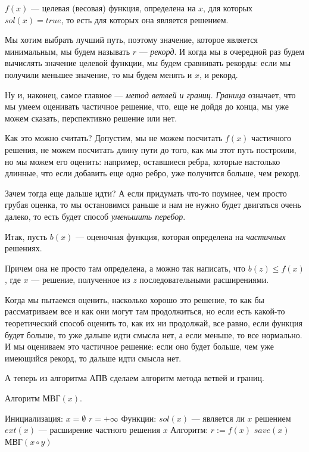 \documentclass[russian]{lecture-notes}
\theoremstyle{definition}
\begin{document}
\begin{example*}
		$f(x)$ --- целевая (весовая) функция, определена на $x$, для которых $sol(x) = true$, то есть для которых она является решением.
		
		Мы хотим выбрать лучший путь, поэтому значение, которое является минимальным, мы будем называть $r$ --- {\em рекорд}.
		И когда мы в очередной раз будем вычислять значение целевой функции, мы будем сравнивать рекорды: если мы получили меньшее значение, то мы будем менять и $x$, и рекорд. 
		
		Ну и, наконец, самое главное --- {\em метод ветвей и границ}.
		{\em Граница} означает, что мы умеем оценивать частичное решение, что, еще не дойдя до конца, мы уже можем сказать, перспективно решение или нет.

		Как это можно считать? Допустим, мы не можем посчитать $f(x)$ частичного решения, не можем посчитать длину пути до того, как мы этот путь построили, но мы можем его оценить: например, оставшиеся ребра, которые настолько длинные, что если добавить еще одно ребро, уже получится больше, чем рекорд.
		
		Зачем тогда еще дальше идти? А если придумать что-то поумнее, чем просто грубая оценка, то мы остановимся раньше и нам не нужно будет двигаться очень далеко, то есть будет способ {\em уменьшить перебор}.
		
		Итак, пусть $b(x)$ --- оценочная функция, которая определена на {\em частичных} решениях.
		
		Причем она не просто там определена, а можно так написать, что $b(z) \leq f(x)$, где $x$ --- решение, полученное из $z$ последовательными расширениями.
		
		Когда мы пытаемся оценить, насколько хорошо это решение, то как бы рассматриваем все и как они могут там продолжиться,
		но если есть какой-то теоретический способ оценить то, как их ни продолжай, все равно, если функция будет больше, то уже дальше идти смысла нет, а если меньше, то все нормально.
		И мы оцениваем это частичное решение: если оно будет больше, чем уже имеющийся рекорд, то дальше идти смысла нет.
		
		А теперь из алгоритма АПВ сделаем алгоритм метода ветвей и границ.
		
		\begin{algorithm}[H]
			\caption{Алгоритм МВГ$(x)$.}
			\label{alg:three}
			\begin{algorithmic}
				\State Инициализация:
				\State $x = \emptyset$
				\State $r = +\infty$
				\State Функции:
				\State $sol(x)$ --- является ли $x$ решением
				\State $ext(x)$ --- расширение частного решения $x$
				\State Алгоритм:
					\State $r := f(x)$
					\State $save(x)$
					\Else
					\State МВГ$(x \circ y)$
					\EndIf
					\EndFor
					\EndIf
				\EndIf
			\end{algorithmic}
		\end{algorithm}
	\end{example*}
\end{document}
